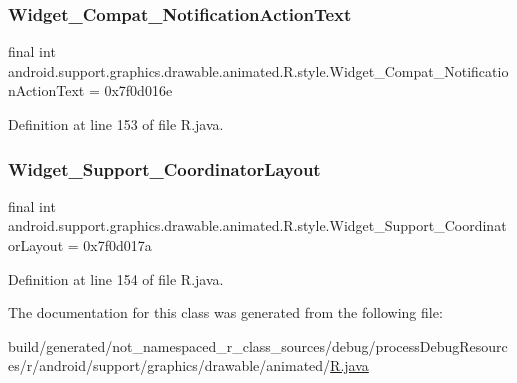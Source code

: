 \subsubsection{\texorpdfstring{Widget\_Compat\_NotificationActionText}{Widget\_Compat\_NotificationActionText}}
{\footnotesize\ttfamily final int android.\+support.\+graphics.\+drawable.\+animated.\+R.\+style.\+Widget\+\_\+\+Compat\+\_\+\+Notification\+Action\+Text = 0x7f0d016e\hspace{0.3cm}{\ttfamily [static]}}



Definition at line 153 of file R.\+java.

\mbox{\label{classandroid_1_1support_1_1graphics_1_1drawable_1_1animated_1_1_r_1_1style_ac8e8534d89e4b29ea3a9f34f37f559b2}} 
\subsubsection{\texorpdfstring{Widget\_Support\_CoordinatorLayout}{Widget\_Support\_CoordinatorLayout}}
{\footnotesize\ttfamily final int android.\+support.\+graphics.\+drawable.\+animated.\+R.\+style.\+Widget\+\_\+\+Support\+\_\+\+Coordinator\+Layout = 0x7f0d017a\hspace{0.3cm}{\ttfamily [static]}}



Definition at line 154 of file R.\+java.



The documentation for this class was generated from the following file\+:\begin{DoxyCompactItemize}
\item 
build/generated/not\+\_\+namespaced\+\_\+r\+\_\+class\+\_\+sources/debug/process\+Debug\+Resources/r/android/support/graphics/drawable/animated/\mbox{\hyperlink{android_2support_2graphics_2drawable_2animated_2_r_8java}{R.\+java}}\end{DoxyCompactItemize}
